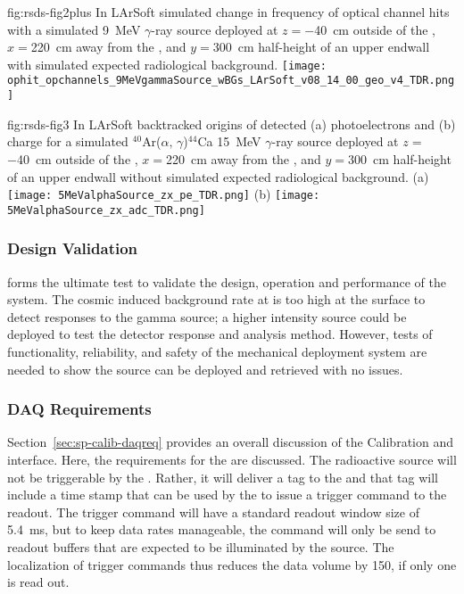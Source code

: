 \begin{dunefigure}
{fig:rsds-fig2plus}
{In LArSoft simulated change in frequency of optical channel hits with a simulated 9~MeV $\gamma$-ray source deployed at $z=$\SI{-40}{\cm} outside of the , $x=$\SI{220}{\cm} away from the , and $y=$\SI{300}{\cm} half-height of an upper endwall  with simulated expected radiological background.}
  \texttt{[image: ophit\_opchannels\_9MeVgammaSource\_wBGs\_LArSoft\_v08\_14\_00\_geo\_v4\_TDR.png]}
\end{dunefigure}


\begin{dunefigure}
{fig:rsds-fig3}
{In LArSoft backtracked origins of detected (a) photoelectrons and (b) charge for a simulated $^{40}$Ar($\alpha,\,\gamma$)$^{44}$Ca 15~MeV $\gamma$-ray source deployed at $z=$\SI{-40}{\cm} outside of the , $x=$\SI{220}{\cm} away from the , and $y=$\SI{300}{\cm} half-height of an upper endwall  without simulated expected radiological background.}
\centering
   (a)
   \texttt{[image: 5MeValphaSource\_zx\_pe\_TDR.png]}
   (b)
   \texttt{[image: 5MeValphaSource\_zx\_adc\_TDR.png]}
\end{dunefigure}



\subsubsection{ Design Validation}
 forms the ultimate test to validate the design, operation and performance of the system. The cosmic induced background rate at  is too high at the surface to detect responses to the  gamma source; a higher intensity source could be deployed to test the detector response and analysis method. However, tests of functionality,  reliability, and safety of the mechanical deployment system are needed to show the source can be deployed and retrieved with no issues.

\subsubsection{DAQ Requirements}
Section~\ref{sec:sp-calib-daqreq} provides an overall discussion of the Calibration and  interface. Here, the  requirements for the  are discussed. The radioactive source will not be triggerable by the .  Rather, it will deliver a tag to the  and that tag will include a time stamp that can be used by the  to issue a trigger command to the  readout.  The trigger command will have a standard readout window size of \SI{5.4}{\milli\s}, but to keep data rates manageable, the command will only be send to  readout buffers that are expected to be illuminated by the source. The localization of trigger commands thus reduces the data volume by \num{150}, if only one  is read out.

